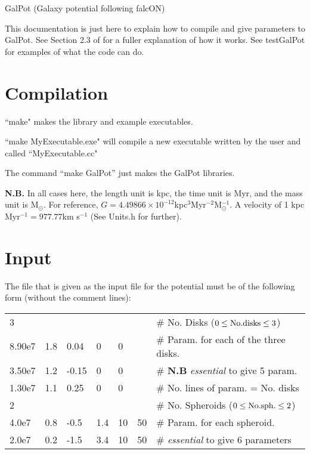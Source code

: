 \documentclass{article}
\begin{document}
\begin{center}
{\huge GalPot (Galaxy potential following falcON)}
\end{center}


This documentation is just here to explain how to compile and give parameters to
GalPot. See Section 2.3 of \citet{DB98} for a fuller explanation of how it works.
See testGalPot for examples of what the code can do.

\section{Compilation}
``make" makes the library and example executables.

\noindent``make MyExecutable.exe" will compile a new executable written by the user and called ``MyExecutable.cc" 

\noindent The command ``make GalPot'' just makes the GalPot libraries. 

 {\bf N.B.} In all cases here, the length unit is kpc, the time unit is Myr, and the mass unit is
M$_\odot$. For reference, $G=4.49866\times
10^{-12}$kpc$^3$Myr$^{-2}$M$_\odot^{-1}$. A velocity of 1 kpc Myr$^{-1}
  = 977.77$km s$^{-1}$ (See Units.h for further).
  
\section{Input} 
The file that is given as the input file for the potential must be of
the following form (without the comment lines):
\vspace{5mm}

\begin{tabular}{lllllll}
3      &     &      &     &    &     &\# No. Disks ($0\leq{\rm No.disks}\leq3$) \\
8.90e7 & 1.8 & 0.04 & 0   & 0  &     &\# Param. for each of the three disks.\\
3.50e7 & 1.2 & -0.15& 0   & 0  &     &\# {\bf N.B} {\it essential} to
give 5 param.\\  
1.30e7 & 1.1 & 0.25 & 0   & 0  &     &\# No. lines of param. = No. disks\\
2      &     &      &     &    &     &\# No. Spheroids ($0\leq{\rm
  No. sph.}\leq2$) \\
4.0e7   & 0.8 & -0.5 & 1.4 & 10 & 50 &\#  Param. for each spheroid. \\ 
2.0e7   & 0.2 & -1.5 & 3.4 & 10 & 50 &\# {\it essential} to give 6 parameters\\
\end{tabular}
\end{document}
